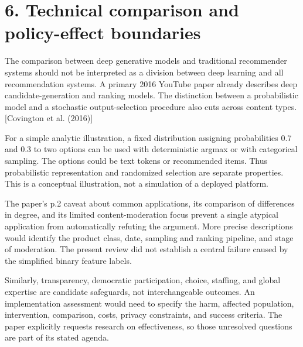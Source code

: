 \documentclass[10pt]{article}
\begin{document}
\section*{6. Technical comparison and policy-effect boundaries}
The comparison between deep generative models and traditional recommender systems should not be interpreted as a division between deep learning and all recommendation systems. A primary 2016 YouTube paper already describes deep candidate-generation and ranking models. The distinction between a probabilistic model and a stochastic output-selection procedure also cuts across content types. [Covington et al. (2016)]\par
For a simple analytic illustration, a fixed distribution assigning probabilities 0.7 and 0.3 to two options can be used with deterministic argmax or with categorical sampling. The options could be text tokens or recommended items. Thus probabilistic representation and randomized selection are separate properties. This is a conceptual illustration, not a simulation of a deployed platform.\par
The paper’s p.2 caveat about common applications, its comparison of differences in degree, and its limited content-moderation focus prevent a single atypical application from automatically refuting the argument. More precise descriptions would identify the product class, date, sampling and ranking pipeline, and stage of moderation. The present review did not establish a central failure caused by the simplified binary feature labels.\par
Similarly, transparency, democratic participation, choice, staffing, and global expertise are candidate safeguards, not interchangeable outcomes. An implementation assessment would need to specify the harm, affected population, intervention, comparison, costs, privacy constraints, and success criteria. The paper explicitly requests research on effectiveness, so those unresolved questions are part of its stated agenda.\par
\end{document}
